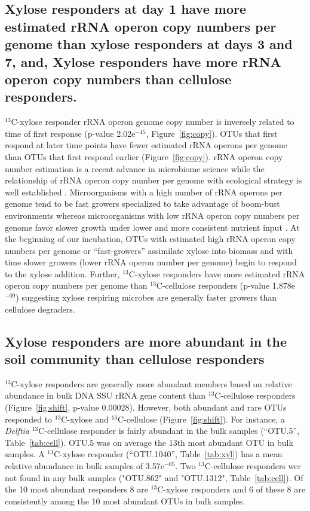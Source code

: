 \subsection{Xylose responders at day 1 have more estimated rRNA operon copy
numbers per genome than xylose responders at days 3 and 7, and, Xylose
responders have more rRNA operon copy numbers
than cellulose responders.}
$^{13}$C-xylose responder rRNA operon genome copy number is inversely related
to time of first response (p-value 2.02e$^{-15}$, Figure~\ref{fig:copy}). OTUs
that first respond at later time points have fewer estimated rRNA operons per
genome than OTUs that first respond earlier (Figure~\ref{fig:copy}). rRNA
operon copy number estimation is a recent advance in microbiome science
\citep{Kembel_2012} while the relationship of rRNA operon copy number per genome
with ecological strategy is well established \citep{Klappenbach_2000}.
Microorganisms with a high number of rRNA operons per genome tend
to be fast growers specialized to take advantage of boom-bust environments
whereas microorganisms with low rRNA operon copy numbers per genome favor
slower growth under lower and more consistent nutrient input
\citep{Klappenbach_2000}. At the beginning of our incubation, OTUs with
estimated high rRNA operon copy numbers per genome or ``fast-growers''
assimilate xylose into biomass and with time slower growers (lower rRNA operon
number per genome) begin to respond to the xylose addition.  Further,
$^{13}$C-xylose responders have more estimated rRNA operon copy numbers per
genome than $^{13}$C-cellulose responders (p-value 1.878e$^{-09}$) suggesting
xylose respiring microbes are generally faster growers than cellulose
degraders.

\subsection{Xylose responders are more abundant in the soil community than cellulose
responders}
$^{13}$C-xylose responders are generally more abundant members based on
relative abundance in bulk DNA SSU rRNA gene content than $^{13}$C-cellulose
responders (Figure~\ref{fig:shift}, p-value 0.00028).  However, both abundant and
rare OTUs responded to $^{13}$C-xylose and $^{13}$C-cellulose
(Figure~\ref{fig:shift}). For instance, a \textit{Delftia} $^{13}$C-cellulose
responder is fairly abundant in the bulk samples (``OTU.5'',
Table~\ref{tab:cell}). OTU.5 was on average the
13th most abundant OTU in bulk samples. A $^{13}$C-xylose responder (``OTU.1040'',
Table~\ref{tab:xyl}) has a mean relative abundance in bulk samples of
3.57e$^{-05}$. Two $^{13}$C-cellulose responders wer not found
in any bulk samples ("OTU.862" and "OTU.1312", Table~\ref{tab:cell}). Of the 10 most abundant
responders 8 are $^{13}$C-xylose responders and 6 of these 8 are consistently
among the 10 most abundant OTUs in bulk samples.
